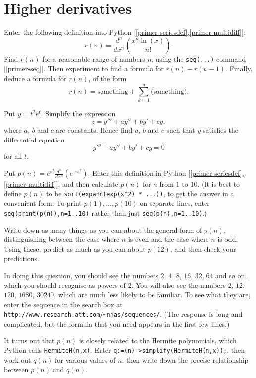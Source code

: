 \documentclass[a4paper,10pt]{amsbook}
\begin{document}
\section{Higher derivatives}

\begin{exercise}\label{ex-Psi}
 Enter the following definition into Python
 [\ref{primer-seriesdef},\ref{primer-multidiff}]:
 \[ r(n) =
    \frac{d^n}{dx^n}\left(\frac{x^n\ln(x)}{n!}\right). 
 \]
 Find $r(n)$ for a reasonable range of numbers $n$, using
 the \verb~seq(...)~ command [\ref{primer-seq}].  Then
 experiment to find a formula for $r(n)-r(n-1)$.  Finally,
 deduce a formula for $r(n)$, of the form
 \[ r(n) = \text{something} +
            \sum_{k=1}^{n}\text{(something)}. 
 \]
\end{exercise}

\begin{exercise}\label{ex-diffop-jordan}
 Put $y=t^2e^t$.  Simplify the expression 
 \[ z = y''' + a y'' + b y' + c y, \]
 where $a$, $b$ and $c$ are constants.  Hence find $a$, $b$
 and $c$ such that $y$ satisfies the differential equation 
 \[ y''' + a y'' + by' + c y = 0 \]
 for all $t$. 
\end{exercise}

\begin{exercise}\label{ex-hermite}
 Put $p(n)=e^{x^2}\frac{d^n}{dx^n}(e^{-x^2})$.  Enter this
 definition in Python [\ref{primer-seriesdef},\ref{primer-multidiff}], and then
 calculate $p(n)$ for $n$ from  $1$ to $10$.  (It is best to
 define $p(n)$ to be \verb~sort(expand(exp(x^2) * ...))~, to
 get the  answer in a convenient form.  To print
 $p(1),\ldots,p(10)$ on separate lines, enter
 \verb~seq(print(p(n)),n=1..10)~ rather than just
 \verb~seq(p(n),n=1..10)~.)  
 
 Write down as many things as you can about the general form
 of $p(n)$, distinguishing between the case where $n$ is
 even and the case where $n$ is odd.  Using these, predict
 as much as you can about $p(12)$, and then
 check your predictions. 
 
 In doing this question, you should see the numbers $2$,
 $4$, $8$, $16$, $32$, $64$ and so on, which you should
 recognise as powers of $2$.  You will also see the numbers
 $2$, $12$, $120$, $1680$, $30240$, which are much less
 likely to be familiar.  To see what they are, enter the
 sequence in the search box at
 \verb+http://www.research.att.com/~njas/sequences/+.  (The
 response is long and complicated, but the formula that you
 need appears in the first few lines.) 

 It turns out that $p(n)$ is closely related to the Hermite
 polynomials, which Python calls \verb~HermiteH(n,x)~.  Enter 
 \verb~q:=(n)->simplify(HermiteH(n,x));~, then work out
 $q(n)$ for various values of $n$, then write down the
 precise relationship between $p(n)$ and $q(n)$.  
\end{exercise}
\end{document}
